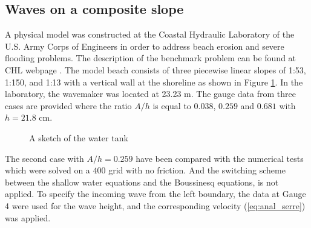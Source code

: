 \documentclass[review]{elsarticle}
\begin{document}
\subsection{Waves on a composite slope}

A physical model was constructed at the Coastal Hydraulic Laboratory of the U.S. Army Corps of Engineers
in order to address beach erosion and severe flooding problems.
The description of the benchmark problem can be found
at CHL webpage \cite{chl_bp5}.
The model beach consists of three piecewise linear slopes of 1:53, 1:150, and 1:13 with a vertical wall at the shoreline as shown in Figure \ref{fig:bp5_water_tank}.
In the laboratory, the wavemaker was located at 23.23 m.
The gauge data from three cases are provided 
where the ratio $A/h$ is equal to $0.038$, $0.259$ and $0.681$
with $h=21.8$ cm.

\begin{figure}[!htb]
\centering
{}
  \caption{A sketch of the water tank}
  \label{fig:bp5_water_tank}
\end{figure}

The second case with $A/h=0.259$ have been 
compared with the numerical tests
which were solved on a $400$ grid with no friction.
And the switching scheme between the shallow water equations
and the Boussinesq equations, is not applied.
To specify the incoming wave from the left boundary, 
the data at Gauge 4 were used for the wave height,
and the corresponding velocity (\ref{eq:anal_serre})
was applied.
\end{document}
